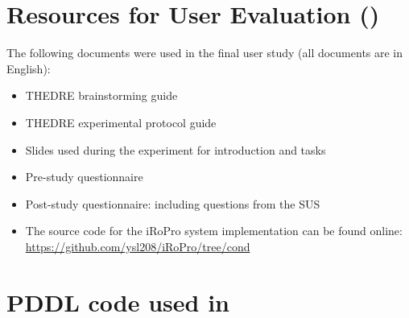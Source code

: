 \chapter{Resources for User Evaluation ()}
\label{app:exp4}
The following documents were used in the final user study (all documents are in English):
\begin{itemize}
	\item{THEDRE brainstorming guide}
	\item{THEDRE experimental protocol guide}
	\item{Slides used during the experiment for introduction and tasks}
	\item{Pre-study questionnaire}
	\item{Post-study questionnaire: including questions from the SUS}
	\item The source code for the iRoPro system implementation can be found online: \url{https://github.com/ysl208/iRoPro/tree/cond}
\end{itemize}





%

\chapter{PDDL code used in }\label{app:pddl}    
